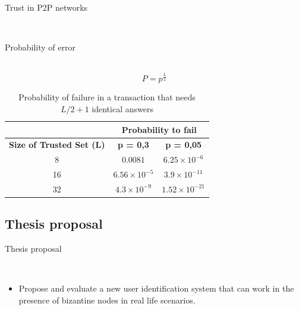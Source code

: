 \documentclass[12pt]{beamer}
\renewcommand{\frametitle}[1]{\vspace{0.2cm}\begin{huge}#1\end{huge}\\}
\renewcommand{\framesubtitle}[1]{\vspace{0.4cm} \hspace{0.4cm}\begin{large}#1\end{large}\\}
\begin{document}
  \begin{frame}
  \frametitle{Trust in P2P networks}
  \framesubtitle{Probability of error}

  \begin{equation} \label{eq:p_leafset}
    P= p^{\frac{L}{2}}
  \end{equation}

  \begin{table}
    \centering
    \footnotesize
    \begin{tabular}{|c|c|c|}
      \cline{2-3}
      \multicolumn{1}{c|}{}&  \multicolumn{2}{c|}{\textbf{Probability to fail}} \\ \cline{2-3}
      \hline
      \textbf{Size of Trusted Set (L)} & \textbf{p = 0,3} & \textbf{p = 0,05} \\
      \hline \hline
      8 &  $0.0081$              & $6.25 \times 10^{-6}$  \\
      \hline
      16 & $6.56 \times 10^{-5}$ & $ 3.9 \times 10^{-11}$ \\
      \hline
      32 & $4.3 \times 10^{-9}$  & $ 1.52 \times 10^{-21} $  \\
      \hline
    \end{tabular}
    \caption{Probability of failure in a transaction that needs $L/2+1$
identical answers}
    \label{tab:p_leafset}
  \end{table}

  \end{frame}
  
  



  



  \subsection{Thesis proposal}
    \begin{frame}
    \frametitle{Thesis proposal}
    \begin{itemize}
      \item Propose and evaluate a new user identification system that can work
in the presence of bizantine nodes in real life scenarios.
    \end{itemize}
    \end{frame}
\end{document}
